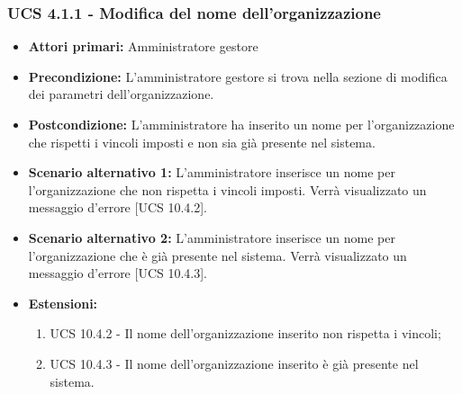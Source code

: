 \subsubsection{UCS 4.1.1 - Modifica del nome dell'organizzazione}%
\begin{itemize}
\item \textbf{Attori primari:} Amministratore gestore
\item \textbf{Precondizione:} L'amministratore gestore si trova nella sezione di modifica dei parametri dell'organizzazione.
\item \textbf{Postcondizione:} L'amministratore ha inserito un nome per l'organizzazione che rispetti i vincoli imposti e non sia già presente nel sistema.
\item \textbf{Scenario alternativo 1:} L'amministratore inserisce un nome per l'organizzazione che non rispetta i vincoli imposti. Verrà visualizzato un messaggio d'errore [UCS 10.4.2].
\item \textbf{Scenario alternativo 2:} L'amministratore inserisce un nome per l'organizzazione che è già presente nel sistema. Verrà visualizzato un messaggio d'errore [UCS 10.4.3].
\item \textbf{Estensioni:}
\begin{enumerate}
    \item UCS 10.4.2 - Il nome dell'organizzazione inserito non rispetta i vincoli;
    \item UCS 10.4.3 - Il nome dell'organizzazione inserito è già presente nel sistema.
\end{enumerate}
\end{itemize}

